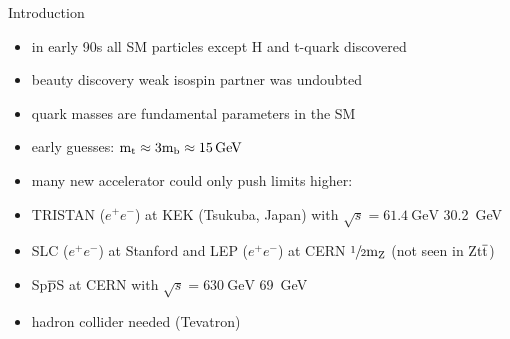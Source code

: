 \begin{frame}{Introduction}

	\begin{minipage}[c][.23\textheight]{.8\textwidth}
		\begin{itemize}
			\itemfill
			\item in early 90s all SM particles except H and t-quark discovered
			\item beauty discovery \ra weak isospin partner was undoubted
			\item quark masses are fundamental parameters in the SM
		\end{itemize}
	\end{minipage}
	\begin{minipage}{.18\textwidth}
	\end{minipage}
	
	\begin{itemize}\itemfill
		\item early guesses: $\text{m}_{\text{t}} \approx 3 \text{m}_{\text{b}} \approx \SI{15}{\giga\electronvolt}$
		\item many new accelerator could only push limits higher:
		\item TRISTAN ($e^+e^-$) at KEK (Tsukuba, Japan) with $\sqrt{s} = \SI{61.4}{\giga\electronvolt}$ \ra \SI{30.2}{\giga\electronvolt}
		\item SLC ($e^+e^-$) at Stanford and LEP ($e^+e^-$) at CERN \ra $\sfrac{1}{2} \text{m}_{\text{Z}}$ (not seen in Z\ch{->}$\text{t}\overline{\text{t}}$)
		\item Sp$\overline{\text{p}}$S at CERN with $\sqrt{s} = \SI{630}{\giga\electronvolt}$ \ra \SI{69}{\giga\electronvolt}
		\item hadron collider needed (\ra Tevatron)
	\end{itemize}
	
\end{frame}
